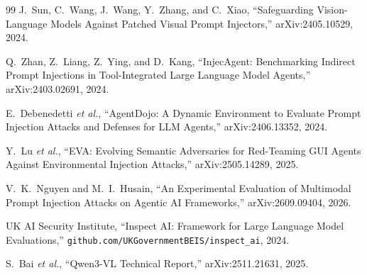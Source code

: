 \documentclass[10pt,twocolumn]{article}
\begin{document}
\begin{thebibliography}{99}
J.~Sun, C.~Wang, J.~Wang, Y.~Zhang, and C.~Xiao,
``Safeguarding Vision-Language Models Against Patched
Visual Prompt Injectors,'' arXiv:2405.10529, 2024.

Q.~Zhan, Z.~Liang, Z.~Ying, and D.~Kang,
``InjecAgent: Benchmarking Indirect Prompt Injections
in Tool-Integrated Large Language Model Agents,''
arXiv:2403.02691, 2024.

E.~Debenedetti \emph{et al.},
``AgentDojo: A Dynamic Environment to Evaluate Prompt
Injection Attacks and Defenses for LLM Agents,''
arXiv:2406.13352, 2024.

Y.~Lu \emph{et al.},
``EVA: Evolving Semantic Adversaries for Red-Teaming
GUI Agents Against Environmental Injection Attacks,''
arXiv:2505.14289, 2025.

V.~K.~Nguyen and M.~I.~Husain,
``An Experimental Evaluation of Multimodal Prompt
Injection Attacks on Agentic AI Frameworks,''
arXiv:2609.09404, 2026.

UK AI Security Institute,
``Inspect AI: Framework for Large Language Model Evaluations,''
\texttt{github.com/UKGovernmentBEIS/inspect\_ai}, 2024.

S.~Bai \emph{et al.},
``Qwen3-VL Technical Report,'' arXiv:2511.21631, 2025.


\end{thebibliography}

\endgroup
\end{document}
